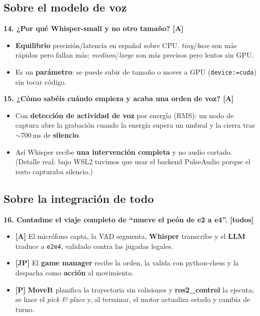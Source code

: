\documentclass[11pt]{article}
\begin{document}
\subsection*{Sobre el modelo de voz}

\textbf{14. ¿Por qué Whisper-small y no otro tamaño? [A]}
\begin{itemize}
    \item \textbf{Equilibrio} precisión/latencia en español sobre CPU.
          \textit{tiny}/\textit{base} son más rápidos pero fallan más;
          \textit{medium}/\textit{large} son más precisos pero lentos sin GPU.
    \item Es un \textbf{parámetro}: se puede subir de tamaño o mover a GPU
          (\texttt{device:=cuda}) sin tocar código.
\end{itemize}

\textbf{15. ¿Cómo sabéis cuándo empieza y acaba una orden de voz? [A]}
\begin{itemize}
    \item Con \textbf{detección de actividad de voz} por energía (RMS): un nodo
          de captura abre la grabación cuando la energía supera un umbral y la
          cierra tras $\sim$700\,ms de \textbf{silencio}.
    \item Así Whisper recibe \textbf{una intervención completa} y no audio
          cortado. (Detalle real: bajo WSL2 tuvimos que usar el backend
          PulseAudio porque el resto capturaba silencio.)
\end{itemize}

\subsection*{Sobre la integración de todo}

\textbf{16. Contadme el viaje completo de ``mueve el peón de e2 a e4''. [todos]}
\begin{itemize}
    \item \textbf{[A]} El micrófono capta, la VAD segmenta, \textbf{Whisper}
          transcribe y el \textbf{LLM} traduce a \texttt{e2e4}, validado contra
          las jugadas legales.
    \item \textbf{[JP]} El \textbf{game manager} recibe la orden, la valida con
          python-chess y la despacha como \textbf{acción} al movimiento.
    \item \textbf{[P]} \textbf{MoveIt} planifica la trayectoria sin colisiones y
          \textbf{ros2\_control} la ejecuta; se hace el \textit{pick \& place} y,
          al terminar, el motor actualiza estado y cambia de turno.
\end{itemize}
\end{document}
